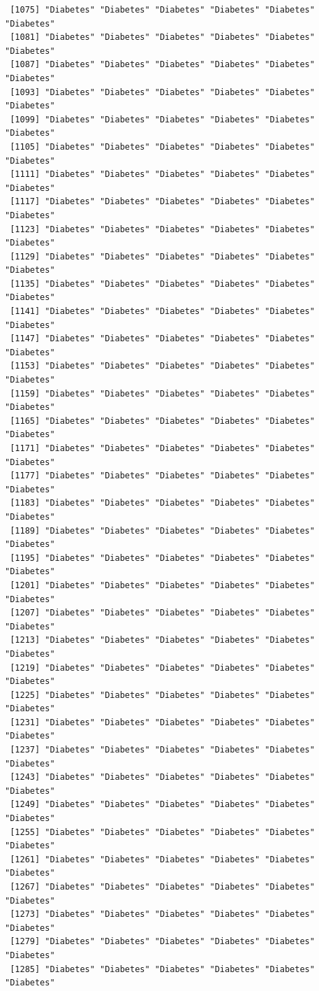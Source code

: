\documentclass[
  letterpaper,
  DIV=11,
  numbers=noendperiod]{scrartcl}
\begin{document}
\begin{verbatim}
 [1075] "Diabetes" "Diabetes" "Diabetes" "Diabetes" "Diabetes" "Diabetes"
 [1081] "Diabetes" "Diabetes" "Diabetes" "Diabetes" "Diabetes" "Diabetes"
 [1087] "Diabetes" "Diabetes" "Diabetes" "Diabetes" "Diabetes" "Diabetes"
 [1093] "Diabetes" "Diabetes" "Diabetes" "Diabetes" "Diabetes" "Diabetes"
 [1099] "Diabetes" "Diabetes" "Diabetes" "Diabetes" "Diabetes" "Diabetes"
 [1105] "Diabetes" "Diabetes" "Diabetes" "Diabetes" "Diabetes" "Diabetes"
 [1111] "Diabetes" "Diabetes" "Diabetes" "Diabetes" "Diabetes" "Diabetes"
 [1117] "Diabetes" "Diabetes" "Diabetes" "Diabetes" "Diabetes" "Diabetes"
 [1123] "Diabetes" "Diabetes" "Diabetes" "Diabetes" "Diabetes" "Diabetes"
 [1129] "Diabetes" "Diabetes" "Diabetes" "Diabetes" "Diabetes" "Diabetes"
 [1135] "Diabetes" "Diabetes" "Diabetes" "Diabetes" "Diabetes" "Diabetes"
 [1141] "Diabetes" "Diabetes" "Diabetes" "Diabetes" "Diabetes" "Diabetes"
 [1147] "Diabetes" "Diabetes" "Diabetes" "Diabetes" "Diabetes" "Diabetes"
 [1153] "Diabetes" "Diabetes" "Diabetes" "Diabetes" "Diabetes" "Diabetes"
 [1159] "Diabetes" "Diabetes" "Diabetes" "Diabetes" "Diabetes" "Diabetes"
 [1165] "Diabetes" "Diabetes" "Diabetes" "Diabetes" "Diabetes" "Diabetes"
 [1171] "Diabetes" "Diabetes" "Diabetes" "Diabetes" "Diabetes" "Diabetes"
 [1177] "Diabetes" "Diabetes" "Diabetes" "Diabetes" "Diabetes" "Diabetes"
 [1183] "Diabetes" "Diabetes" "Diabetes" "Diabetes" "Diabetes" "Diabetes"
 [1189] "Diabetes" "Diabetes" "Diabetes" "Diabetes" "Diabetes" "Diabetes"
 [1195] "Diabetes" "Diabetes" "Diabetes" "Diabetes" "Diabetes" "Diabetes"
 [1201] "Diabetes" "Diabetes" "Diabetes" "Diabetes" "Diabetes" "Diabetes"
 [1207] "Diabetes" "Diabetes" "Diabetes" "Diabetes" "Diabetes" "Diabetes"
 [1213] "Diabetes" "Diabetes" "Diabetes" "Diabetes" "Diabetes" "Diabetes"
 [1219] "Diabetes" "Diabetes" "Diabetes" "Diabetes" "Diabetes" "Diabetes"
 [1225] "Diabetes" "Diabetes" "Diabetes" "Diabetes" "Diabetes" "Diabetes"
 [1231] "Diabetes" "Diabetes" "Diabetes" "Diabetes" "Diabetes" "Diabetes"
 [1237] "Diabetes" "Diabetes" "Diabetes" "Diabetes" "Diabetes" "Diabetes"
 [1243] "Diabetes" "Diabetes" "Diabetes" "Diabetes" "Diabetes" "Diabetes"
 [1249] "Diabetes" "Diabetes" "Diabetes" "Diabetes" "Diabetes" "Diabetes"
 [1255] "Diabetes" "Diabetes" "Diabetes" "Diabetes" "Diabetes" "Diabetes"
 [1261] "Diabetes" "Diabetes" "Diabetes" "Diabetes" "Diabetes" "Diabetes"
 [1267] "Diabetes" "Diabetes" "Diabetes" "Diabetes" "Diabetes" "Diabetes"
 [1273] "Diabetes" "Diabetes" "Diabetes" "Diabetes" "Diabetes" "Diabetes"
 [1279] "Diabetes" "Diabetes" "Diabetes" "Diabetes" "Diabetes" "Diabetes"
 [1285] "Diabetes" "Diabetes" "Diabetes" "Diabetes" "Diabetes" "Diabetes"

\end{verbatim}
\end{document}
